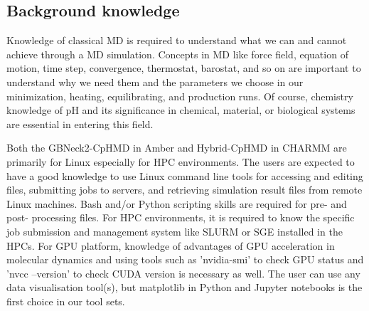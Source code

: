 \documentclass[9pt,tutorial]{livecoms}
\begin{document}

\subsection{Background knowledge}
Knowledge of classical MD is required to understand what we can and cannot achieve through a MD simulation. Concepts in MD like force field, equation of motion, time step, convergence, thermostat, barostat, and so on are important to understand why we need them and the parameters we choose in our minimization, heating, equilibrating, and production runs. Of course, chemistry knowledge of pH and its significance in chemical, material, or biological systems are essential in entering this field.

Both the GBNeck2-CpHMD in Amber and Hybrid-CpHMD in CHARMM are primarily for Linux especially for HPC environments. The users are expected to have a good knowledge to use Linux command line tools for accessing and editing files, submitting jobs to servers, and retrieving simulation result files from remote Linux machines. Bash and/or Python scripting skills are required for pre- and post- processing files. For HPC environments, it is required to know the specific job submission and management system like SLURM or SGE installed in the HPCs. For GPU platform, knowledge of advantages of GPU acceleration in molecular dynamics and using tools such as 'nvidia-smi' to check GPU status and 'nvcc --version' to check CUDA version is necessary as well. The user can use any data visualisation tool(s), but matplotlib in Python and Jupyter notebooks is the first choice in our tool sets.  
\end{document}
